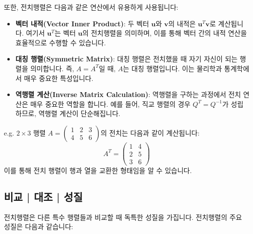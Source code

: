 \noindent 또한, 전치행렬은 다음과 같은 연산에서 유용하게 사용됩니다:

\begin{itemize}
  \item \textbf{벡터 내적(Vector Inner Product)}: 두 벡터 \( \mathbf{u} \)와 \( \mathbf{v} \)의 내적은 \( \mathbf{u}^T \mathbf{v} \)로 계산됩니다. 여기서 \( \mathbf{u}^T \)는 벡터 \( \mathbf{u} \)의 전치행렬을 의미하며, 이를 통해 벡터 간의 내적 연산을 효율적으로 수행할 수 있습니다.

  \item \textbf{대칭 행렬(Symmetric Matrix)}: 대칭 행렬은 전치했을 때 자기 자신이 되는 행렬을 의미합니다. 즉, \( A = A^T \)일 때, \( A \)는 대칭 행렬입니다. 이는 물리학과 통계학에서 매우 중요한 특성입니다.

  \item \textbf{역행렬 계산(Inverse Matrix Calculation)}: 역행렬을 구하는 과정에서 전치 연산은 매우 중요한 역할을 합니다. 예를 들어, 직교 행렬의 경우 \( Q^T = Q^{-1} \)가 성립하므로, 역행렬 계산이 단순해집니다.
\end{itemize}

\vspace{1\baselineskip}
\noindent {} e.g. \(2 \times 3\) 행렬 \( A = \begin{pmatrix} 1 & 2 & 3 \\ 4 & 5 & 6 \end{pmatrix} \)의 전치는 다음과 같이 계산됩니다:
\[
  A^T = \begin{pmatrix} 1 & 4 \\ 2 & 5 \\ 3 & 6 \end{pmatrix}
\]
이를 통해 전치 행렬이 행과 열을 교환한 형태임을 알 수 있습니다.

\subsection{비교 | 대조 | 성질}
전치행렬은 다른 특수 행렬들과 비교할 때 독특한 성질을 가집니다. 전치행렬의 주요 성질은 다음과 같습니다:

